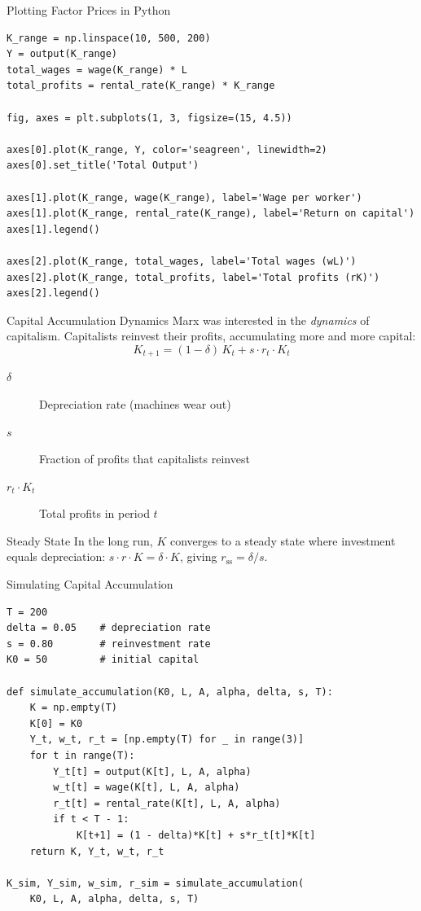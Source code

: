 \documentclass[aspectratio=169, 10pt]{beamer}
\begin{document}
\begin{frame}[fragile]{Plotting Factor Prices in Python}
\begin{lstlisting}
K_range = np.linspace(10, 500, 200)
Y = output(K_range)
total_wages = wage(K_range) * L
total_profits = rental_rate(K_range) * K_range

fig, axes = plt.subplots(1, 3, figsize=(15, 4.5))

axes[0].plot(K_range, Y, color='seagreen', linewidth=2)
axes[0].set_title('Total Output')

axes[1].plot(K_range, wage(K_range), label='Wage per worker')
axes[1].plot(K_range, rental_rate(K_range), label='Return on capital')
axes[1].legend()

axes[2].plot(K_range, total_wages, label='Total wages (wL)')
axes[2].plot(K_range, total_profits, label='Total profits (rK)')
axes[2].legend()
\end{lstlisting}
\end{frame}

\begin{frame}{Capital Accumulation Dynamics}
Marx was interested in the \textit{dynamics} of capitalism.
Capitalists reinvest their profits, accumulating more and more capital:
\vspace{0.5em}
\[
  K_{t+1} = (1 - \delta)\,K_t + s \cdot r_t \cdot K_t
\]
\vspace{0.3em}
\begin{description}
  \item[$\delta$] Depreciation rate (machines wear out)
  \item[$s$] Fraction of profits that capitalists reinvest
  \item[$r_t \cdot K_t$] Total profits in period $t$
\end{description}
\vspace{0.5em}
\begin{alertblock}{Steady State}
In the long run, $K$ converges to a steady state where investment
equals depreciation: $s \cdot r \cdot K = \delta \cdot K$, giving
$r_{\text{ss}} = \delta / s$.
\end{alertblock}
\end{frame}

\begin{frame}[fragile]{Simulating Capital Accumulation}
\begin{lstlisting}
T = 200
delta = 0.05    # depreciation rate
s = 0.80        # reinvestment rate
K0 = 50         # initial capital

def simulate_accumulation(K0, L, A, alpha, delta, s, T):
    K = np.empty(T)
    K[0] = K0
    Y_t, w_t, r_t = [np.empty(T) for _ in range(3)]
    for t in range(T):
        Y_t[t] = output(K[t], L, A, alpha)
        w_t[t] = wage(K[t], L, A, alpha)
        r_t[t] = rental_rate(K[t], L, A, alpha)
        if t < T - 1:
            K[t+1] = (1 - delta)*K[t] + s*r_t[t]*K[t]
    return K, Y_t, w_t, r_t

K_sim, Y_sim, w_sim, r_sim = simulate_accumulation(
    K0, L, A, alpha, delta, s, T)
\end{lstlisting}
\end{frame}
\end{document}

